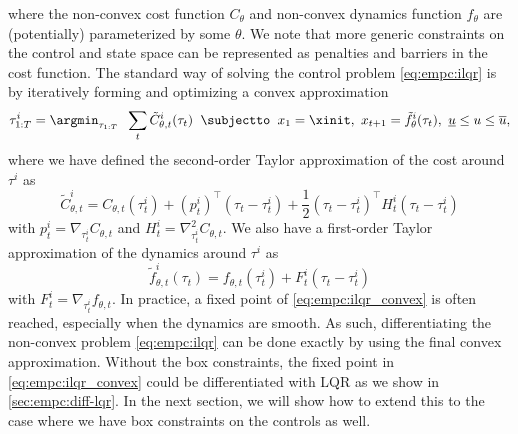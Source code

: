 where the non-convex cost function $C_\theta$ and non-convex
dynamics function $f_\theta$ are (potentially) parameterized
by some $\theta$.
We note that more generic constraints on the control
and state space can be represented as penalties and barriers
in the cost function.
The standard way of solving the control problem
\cref{eq:empc:ilqr} is by iteratively forming and
optimizing a convex approximation
\begin{equation}
  \label{eq:empc:ilqr_convex}
    \tau_{1:T}^i = \argmin_{\tau_{1:T}}\;\; \sum_t \tilde C_{\theta,t}^i(\tau_t) \;\;
    \subjectto\;\;
    x_1 = \xinit,\
    x_{t+1} = \tilde f_\theta^i(\tau_t),\
    \underline{u} \leq u \leq \overline{u},
\end{equation}
where we have defined the second-order Taylor approximation of the
cost around $\tau^i$ as
\begin{equation}
  \label{eq:empc:ilqr-cost-taylor}
  \tilde C_{\theta,t}^i = C_{\theta,t}(\tau_t^i) + (p_t^i)^\top (\tau_t-\tau_t^i) +
  \frac{1}{2} (\tau_t-\tau_t^i)^\top  H_t^i(\tau_t-\tau_t^i)
\end{equation}
with $p_t^i=\nabla_{\tau_t^i} C_{\theta,t}$ and
$H_t^i=\nabla_{\tau_t^i}^2 C_{\theta,t}$.
We also have a first-order Taylor approximation of the dynamics around $\tau^i$
as
\begin{equation}
  \label{eq:empc:ilqr-dynamics-taylor}
  \tilde f_{\theta,t}^i(\tau_t) = f_{\theta,t}(\tau_t^i) + F_t^i(\tau_t-\tau_t^i)
\end{equation}
with $F_t^i=\nabla_{\tau_t^i} f_{\theta,t}$.
In practice, a fixed point of \cref{eq:empc:ilqr_convex} is often
reached, especially when the dynamics are smooth.
As such, differentiating the non-convex problem \cref{eq:empc:ilqr}
can be done exactly by using the final
convex approximation.
Without the box constraints, the fixed point in
\cref{eq:empc:ilqr_convex} could be differentiated
with LQR as we show in \cref{sec:empc:diff-lqr}.
In the next section, we will show how to extend this to the case where we have box constraints on the controls as well.

\newpage
